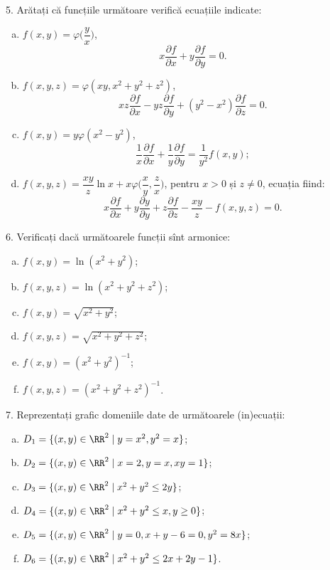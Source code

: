 \vspace{1cm}

5. Arătați că funcțiile următoare verifică ecuațiile indicate:
\begin{enumerate}[(a)]
\item $ f(x, y) = \varphi \Big( \dfrac{y}{x} \Big) $,
  \[
    x \frac{\partial f}{\partial x} + y \frac{\partial f}{\partial y} = 0.
  \]
\item $ f(x, y, z) = \varphi(xy, x^2 + y^2 + z^2) $,
  \[
    xz \frac{\partial f}{\partial x} - yz \frac{\partial f}{\partial y} + %
    (y^2 - x^2) \frac{\partial f}{\partial z} = 0.
  \]
\item $ f(x, y) = y \varphi(x^2 - y^2) $,
  \[
    \frac{1}{x} \frac{\partial f}{\partial x} + \frac{1}{y} \frac{\partial f}{\partial y} = %
    \frac{1}{y^2} f(x, y);
  \]
\item $ f(x, y, z) = \dfrac{xy}{z} \ln x + x\varphi \Big( \dfrac{x}{y}, \dfrac{z}{x} \Big) $,
  pentru $ x > 0 $ și $ z \neq 0 $, ecuația fiind:
  \[
    x \frac{\partial f}{\partial x} + y \frac{\partial y}{\partial y} + z \frac{\partial f}{\partial z} - %
    \frac{xy}{z} - f(x, y, z) = 0.
  \]
\end{enumerate}

\vspace{1cm}

6. Verificați dacă următoarele funcții sînt armonice:
\begin{enumerate}[(a)]
\item $ f(x, y) = \ln(x^2 + y^2) $;
\item $ f(x, y, z) = \ln(x^2 + y^2 + z^2) $;
\item $ f(x, y) = \sqrt{x^2 + y^2} $;
\item $ f(x, y, z) = \sqrt{x^2 + y^2 + z^2} $;
\item $ f(x, y) = (x^2 + y^2)^{-1} $;
\item $ f(x, y, z) = (x^2 + y^2 + z^2)^{-1} $.
\end{enumerate}


\vspace{1cm}

7. Reprezentați grafic domeniile date de următoarele (in)ecuații:
\begin{enumerate}[(a)]
\item $ D_1 = \{ (x, y) \in \RR^2 \mid y = x^2, y^2 = x \} $;
\item $ D_2 = \{ (x, y) \in \RR^2 \mid x = 2, y = x, xy = 1 \} $;
\item $ D_3 = \{ (x, y) \in \RR^2 \mid x^2 + y^2 \leq 2y \} $;
\item $ D_4 = \{ (x, y) \in \RR^2 \mid x^2 + y^2 \leq x, y \geq 0 \} $;
\item $ D_5 = \{ (x, y) \in \RR^2 \mid y = 0, x + y - 6 = 0, y^2 = 8x \} $;
\item $ D_6 = \{ (x, y) \in \RR^2 \mid x^2 + y^2 \leq 2x + 2y - 1 \} $.
\end{enumerate}



